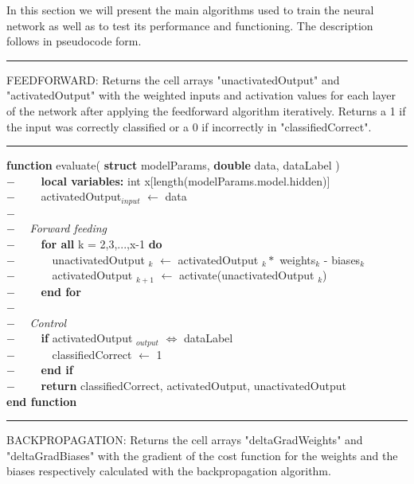 In this section we will present the main algorithms used to train the neural network as well as to test its performance and functioning. The description follows in pseudocode form.\\
\rule{\textwidth}{0.4pt}
 FEEDFORWARD: Returns the cell arrays "unactivatedOutput" and "activatedOutput" with the weighted inputs and activation values for each layer of the network after applying the feedforward algorithm iteratively. Returns a 1 if the input was correctly classified or a 0 if incorrectly in "classifiedCorrect".\\
\rule{\textwidth}{0.4pt}
\begin{addmargin}[2em]{0em}
\textbf{function} evaluate( \textbf{struct} modelParams, \textbf{double} data, dataLabel )\\
    $- \qquad$ \textbf{local variables:} int x[length(modelParams.model.hidden)]\\
    $- \qquad$ activatedOutput$_{input}$ $\leftarrow$ data\\
    $- \qquad $\\
    $- \quad $ \textit{Forward feeding}\\
    $- \qquad $ \textbf{for all} k = 2,3,...,x-1 \textbf{do}\\
    $- \qquad \quad $ unactivatedOutput $_k$ 
    $\leftarrow$ activatedOutput $_{k}*$ weights$_{k}$ - biases$_{k}$ \\
    $- \qquad \quad $ activatedOutput $_{k+1}$ 
    $\leftarrow$ activate(unactivatedOutput $_k$)\\
    $- \qquad $ \textbf{end for}\\
    $- \qquad $\\
    $- \quad $ \textit{Control}\\
    $- \qquad $ \textbf{if} activatedOutput $_{output}$ $\Longleftrightarrow$ dataLabel\\
    $- \qquad \quad$ classifiedCorrect $\leftarrow$ 1\\
    $- \qquad$ \textbf{end if}\\
    $- \qquad$ \textbf{return} classifiedCorrect, activatedOutput,  unactivatedOutput\\
\textbf{end function}\\
\end{addmargin}
\rule{\textwidth}{0.4pt}
 BACKPROPAGATION: Returns the cell arrays "deltaGradWeights" and "deltaGradBiases" with the gradient of the cost function for the weights and the biases respectively calculated with the backpropagation algorithm.\\
